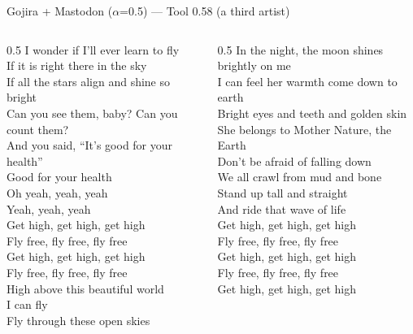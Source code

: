 \documentclass[aspectratio=169]{beamer}
\begin{document}
\begin{frame}{Gojira + Mastodon ($\alpha$=0.5) --- \textcolor{accent}{Tool 0.58 (a third artist)}}
  \scriptsize\itshape\raggedright
  \begin{columns}[T]
    \begin{column}{0.5\textwidth}
      I wonder if I'll ever learn to fly\\
      If it is right there in the sky\\
      If all the stars align and shine so bright\\
      Can you see them, baby? Can you count them?\\[4pt]
      And you said, ``It's good for your health''\\
      Good for your health\\
      Oh yeah, yeah, yeah\\
      Yeah, yeah, yeah\\[4pt]
      Get high, get high, get high\\
      Fly free, fly free, fly free\\
      Get high, get high, get high\\
      Fly free, fly free, fly free\\
      High above this beautiful world\\
      I can fly\\
      Fly through these open skies
    \end{column}
    \begin{column}{0.5\textwidth}
      In the night, the moon shines brightly on me\\
      I can feel her warmth come down to earth\\
      Bright eyes and teeth and golden skin\\
      She belongs to Mother Nature, the Earth\\
      Don't be afraid of falling down\\
      We all crawl from mud and bone\\
      Stand up tall and straight\\
      And ride that wave of life\\[4pt]
      Get high, get high, get high\\
      Fly free, fly free, fly free\\
      Get high, get high, get high\\
      Fly free, fly free, fly free\\
      Get high, get high, get high\\

\end{column}
\end{columns}
\end{frame}
\end{document}
